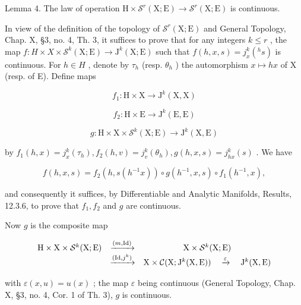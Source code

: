 Lemma 4. The law of operation \(\mathrm{H} \times \mathcal{S}^r (\mathrm{X};\mathrm{E}) \to \mathcal{S}^r (\mathrm{X};\mathrm{E})\) is continuous.

In view of the definition of the topology of \(\mathcal{S}^{r}(\mathrm{X};\mathrm{E})\) and General Topology, Chap. X, §3, no. 4, Th. 3, it suffices to prove that for any integers \(k \leq r\) , the map \(f : H \times X \times \mathcal{S}^{k}(\mathrm{X};\mathrm{E}) \to \mathrm{J}^{k}(\mathrm{X};\mathrm{E})\) such that \(f(h,x,s) = j_{x}^{k}(^{h}s)\) is continuous. For \(h \in H\) , denote by \(\tau_{h}\) (resp. \(\theta_{h}\) ) the automorphism \(x \mapsto hx\) of X (resp. of E). Define maps

\[
f _ {1}: \mathrm{H} \times \mathrm{X} \to \mathrm{J} ^ {k} (\mathrm{X}, \mathrm{X})
\]

\[
f _ {2}: \mathrm{H} \times \mathrm{E} \rightarrow \mathrm{J} ^ {k} (\mathrm{E}, \mathrm{E})
\]

\[
g: \mathrm{H} \times \mathrm{X} \times \mathcal {S} ^ {k} (\mathrm{X}; \mathrm{E}) \to \mathrm{J} ^ {k} (\mathrm{X}, \mathrm{E})
\]

by \(f_{1}(h,x) = j_{x}^{k}(\tau_{h}),f_{2}(h,v) = j_{v}^{k}(\theta_{h}),g(h,x,s) = j_{hx}^{k}(s)\) . We have

\[
f (h, x, s) = f _ {2} (h, s (h ^ {- 1} x)) \circ g (h ^ {- 1}, x, s) \circ f _ {1} (h ^ {- 1}, x),
\]

and consequently it suffices, by Differentiable and Analytic Manifolds, Results, 12.3.6, to prove that \(f_{1}, f_{2}\) and \(g\) are continuous.

Now \(g\) is the composite map

\[
\begin{array}{c c c} \mathrm{H} \times \mathrm{X} \times \mathcal {S} ^ {k} (\mathrm{X}; \mathrm{E}) & \xrightarrow {(m , \mathrm{Id})} & \mathrm{X} \times \mathcal {S} ^ {k} (\mathrm{X}; \mathrm{E}) \\ & \xrightarrow {(\mathrm{Id} , j ^ {k})} & \mathrm{X} \times \mathcal {C} (\mathrm{X}; \mathrm{J} ^ {k} (\mathrm{X}, \mathrm{E})) \quad \xrightarrow {\varepsilon} \quad \mathrm{J} ^ {k} (\mathrm{X}, \mathrm{E}) \end{array}
\]

with \(\varepsilon(x, u) = u(x)\) ; the map \(\varepsilon\) being continuous (General Topology, Chap. X, §3, no. 4, Cor. 1 of Th. 3), \(g\) is continuous.

